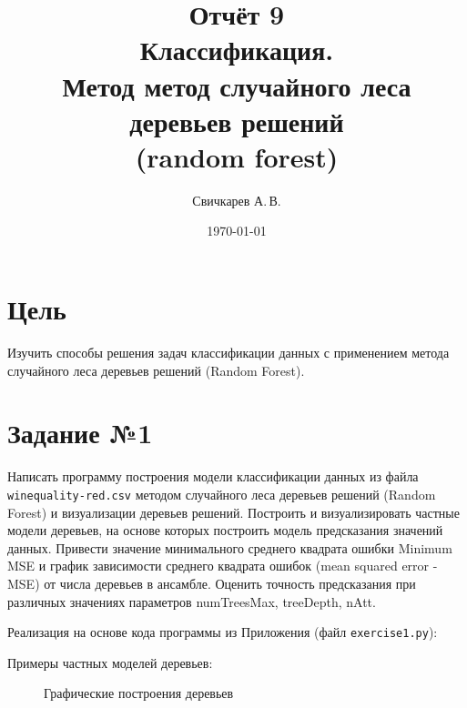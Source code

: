 \documentclass{article} %
\title{Отчёт 9\protect\\
    Классификация.\\
    Метод метод случайного леса деревьев решений\\
    (random forest)} %
\author{Свичкарев А.\,В.} %
\date{\today} %
\begin{document}

\maketitle %

\section{Цель}
Изучить способы решения задач классификации данных с
применением метода случайного леса деревьев решений (Random Forest).

\section{Задание №1}
Написать программу построения модели классификации
данных из файла
\verb$winequality-red.csv$ методом случайного леса деревьев решений
(Random Forest) и визуализации деревьев решений.
Построить и визуализировать частные модели деревьев,
на основе которых построить модель предсказания значений данных.
Привести значение минимального среднего квадрата ошибки
Minimum MSE и график зависимости среднего квадрата ошибок (mean squared error - MSE) от числа деревьев в ансамбле.
Оценить точность предсказания при различных значениях параметров
numTreesMax, treeDepth, nAtt.
\bigskip

Реализация на основе кода программы из Приложения (файл \verb$exercise1.py$):
\bigskip

Примеры частных моделей деревьев:
\begin{figure}[H]
	\centering
	\hfill
    \caption{Графические построения деревьев}
\end{figure}
\bigskip
\end{document}
